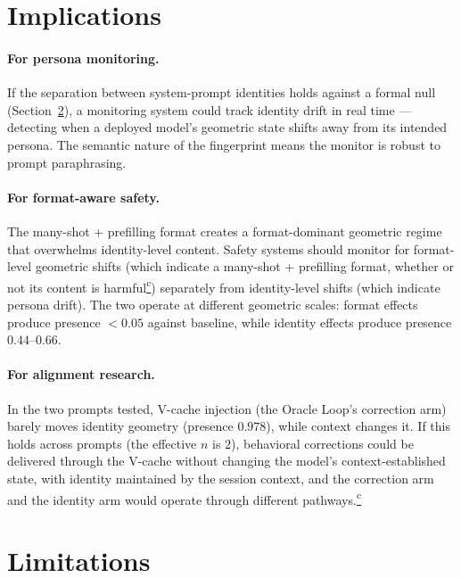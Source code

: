 \documentclass[11pt,a4paper]{article}
\newcommand{\corrmark}{\hyperref[sec:corrections]{\textsuperscript{c}}}
\begin{document}
\section{Implications}
\label{sec:implications}

\paragraph{For persona monitoring.}
If the separation between system-prompt identities holds against a formal
null (Section~\ref{sec:limitations}), a monitoring system could track identity drift in
real time --- detecting when a deployed model's geometric state shifts
away from its intended persona. The semantic nature of the fingerprint
means the monitor is robust to prompt paraphrasing.

\paragraph{For format-aware safety.}
The many-shot + prefilling format creates a format-dominant geometric
regime that overwhelms identity-level content. Safety systems should
monitor for format-level geometric shifts (which indicate a many-shot +
prefilling format, whether or not its content is harmful\corrmark) separately from identity-level shifts
(which indicate persona drift). The two operate at different geometric
scales: format effects produce presence $< 0.05$ against baseline, while
identity effects produce presence $0.44$--$0.66$.

\paragraph{For alignment research.}
In the two prompts tested, V-cache injection (the Oracle Loop's correction
arm) barely moves identity geometry (presence $0.978$), while context
changes it. If this holds across prompts (the effective $n$ is 2),
behavioral corrections could be delivered through the V-cache without
changing the model's context-established state, with identity maintained
by the session context, and the correction arm and the identity arm would
operate through different pathways.\corrmark

\section{Limitations}
\label{sec:limitations}
\end{document}

